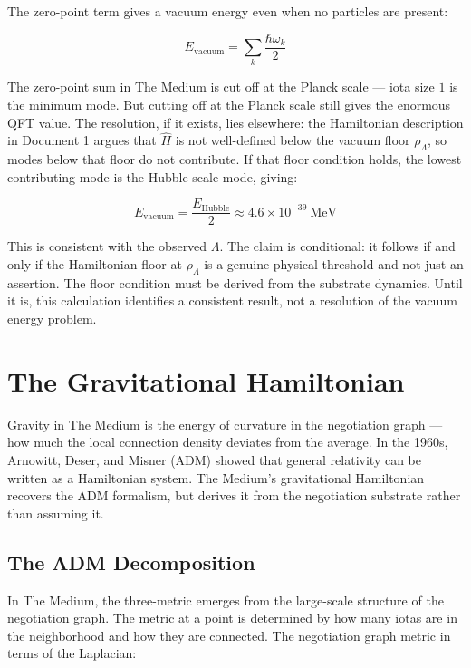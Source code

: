 \documentclass[11pt,letterpaper]{article}
\newenvironment{plainbox}{\begin{tcolorbox}[colback=blue!3!white,colframe=blue!40!white,title={\small\textit{In plain language}},breakable]}{\end{tcolorbox}}
\begin{document}
The zero-point term gives a vacuum energy even when no particles are present:

\begin{equation}
E_\text{vacuum} = \sum_k \frac{\hbar\omega_k}{2}
\end{equation}

The zero-point sum in The Medium is cut off at the Planck scale --- iota size \(1\) is the minimum mode. But cutting off at the Planck scale still gives the enormous QFT value. The resolution, if it exists, lies elsewhere: the Hamiltonian description in Document 1 argues that \(\hat{H}\) is not well-defined below the vacuum floor \(\rho_\Lambda\), so modes below that floor do not contribute. If that floor condition holds, the lowest contributing mode is the Hubble-scale mode, giving:

\begin{equation}
E_\text{vacuum} = \frac{E_\text{Hubble}}{2} \approx 4.6 \times 10^{-39}\ \text{MeV}
\end{equation}

This is consistent with the observed \(\Lambda\). The claim is conditional: it follows if and only if the Hamiltonian floor at \(\rho_\Lambda\) is a genuine physical threshold and not just an assertion. The floor condition must be derived from the substrate dynamics. Until it is, this calculation identifies a consistent result, not a resolution of the vacuum energy problem.

\section{The Gravitational Hamiltonian}
\label{sec:orgbd7f21e}

\begin{plainbox}
Gravity in The Medium is the energy of curvature in the negotiation graph --- how much the local connection density deviates from the average. In the 1960s, Arnowitt, Deser, and Misner (ADM) showed that general relativity can be written as a Hamiltonian system. The Medium's gravitational Hamiltonian recovers the ADM formalism, but derives it from the negotiation substrate rather than assuming it.
\end{plainbox}

\subsection{The ADM Decomposition}
\label{sec:orgc6d4a51}

In The Medium, the three-metric emerges from the large-scale structure of the negotiation graph. The metric at a point is determined by how many iotas are in the neighborhood and how they are connected. The negotiation graph metric in terms of the Laplacian:
\end{document}
